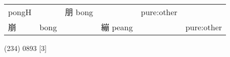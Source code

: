 \documentclass[14pt,a4paper]{scrartcl}
\begin{document}
\begin{longtable}[c]{@{}llllll@{}}
\begin{minipage}[t]{0.14\columnwidth}
pongH
\strut\end{minipage} &
\begin{minipage}[t]{0.14\columnwidth}\raggedright\strut
\strut\end{minipage} &
\begin{minipage}[t]{0.14\columnwidth}\raggedright\strut
朋 bong
\strut\end{minipage} &
\begin{minipage}[t]{0.14\columnwidth}\raggedright\strut
\strut\end{minipage} &
\begin{minipage}[t]{0.14\columnwidth}\raggedright\strut
pure:other
\strut\end{minipage}\tabularnewline
\begin{minipage}[t]{0.14\columnwidth}\raggedright\strut
崩
\strut\end{minipage} &
\begin{minipage}[t]{0.14\columnwidth}\raggedright\strut
bong
\strut\end{minipage} &
\begin{minipage}[t]{0.14\columnwidth}\raggedright\strut
\strut\end{minipage} &
\begin{minipage}[t]{0.14\columnwidth}\raggedright\strut
繃 peang
\strut\end{minipage} &
\begin{minipage}[t]{0.14\columnwidth}\raggedright\strut
\strut\end{minipage} &
\begin{minipage}[t]{0.14\columnwidth}\raggedright\strut
pure:other
\strut\end{minipage}\tabularnewline
\bottomrule
\end{longtable}

(234) 0893 {[}3{]}
\end{document}
